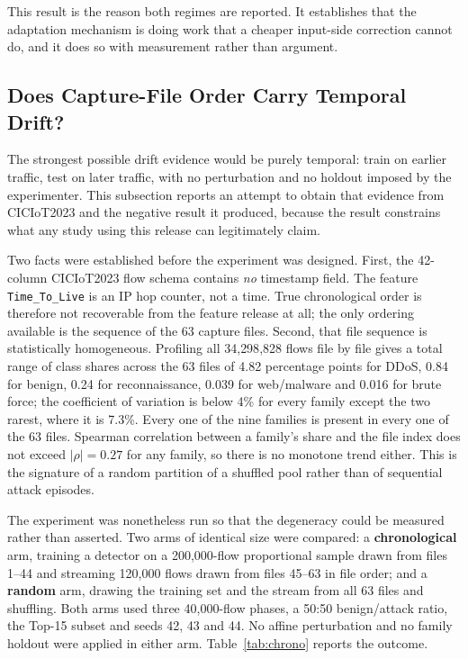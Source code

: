 \documentclass[11pt,a4paper]{article}
\newcommand{\feat}[1]{\texttt{#1}}
\begin{document}
This result is the reason both regimes are reported. It establishes that the
adaptation mechanism is doing work that a cheaper input-side correction cannot
do, and it does so with measurement rather than argument.

\subsection{Does Capture-File Order Carry Temporal Drift?}
\label{sec:chrono}

The strongest possible drift evidence would be purely temporal: train on
earlier traffic, test on later traffic, with no perturbation and no holdout
imposed by the experimenter. This subsection reports an attempt to obtain that
evidence from CICIoT2023 and the negative result it produced, because the
result constrains what any study using this release can legitimately claim.

Two facts were established before the experiment was designed. First, the
42-column CICIoT2023 flow schema contains \emph{no} timestamp field. The
feature \feat{Time\_To\_Live} is an IP hop counter, not a time. True
chronological order is therefore not recoverable from the feature release at
all; the only ordering available is the sequence of the 63 capture files.
Second, that file sequence is statistically homogeneous. Profiling all
34{,}298{,}828 flows file by file gives a total range of class shares across
the 63 files of 4.82 percentage points for DDoS, 0.84 for benign, 0.24 for
reconnaissance, 0.039 for web/malware and 0.016 for brute force; the
coefficient of variation is below 4\% for every family except the two rarest,
where it is 7.3\%. Every one of the nine families is present in every one of
the 63 files. Spearman correlation between a family's share and the file index
does not exceed $|\rho| = 0.27$ for any family, so there is no monotone trend
either. This is the signature of a random partition of a shuffled pool rather
than of sequential attack episodes.

The experiment was nonetheless run so that the degeneracy could be measured
rather than asserted. Two arms of identical size were compared: a
\textbf{chronological} arm, training a detector on a 200{,}000-flow
proportional sample drawn from files 1--44 and streaming 120{,}000 flows drawn
from files 45--63 in file order; and a \textbf{random} arm, drawing the
training set and the stream from all 63 files and shuffling. Both arms used
three 40{,}000-flow phases, a 50:50 benign/attack ratio, the Top-15 subset and
seeds 42, 43 and 44. No affine perturbation and no family holdout were applied
in either arm. Table~\ref{tab:chrono} reports the outcome.
\end{document}
